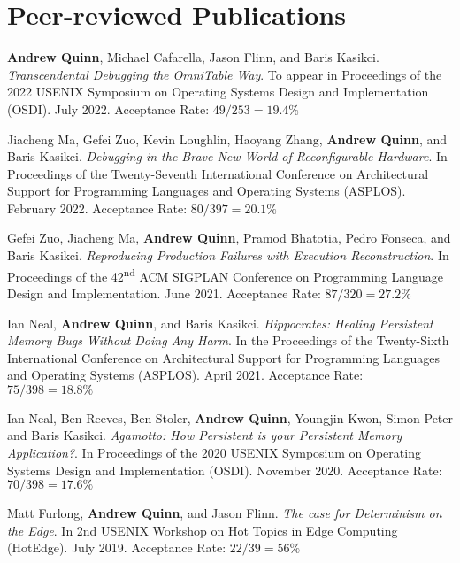 \documentclass[letterpaper,10pt]{article}
\newcommand{\paper}[3]{#1. #2 #3}
\begin{document}
\section{Peer-reviewed Publications}
\begin{smenumerate}
\item \paper{\textbf{Andrew Quinn}, Michael Cafarella, Jason Flinn,
  and Baris Kasikci}{\emph{Transcendental Debugging the OmniTable
  Way}.  To appear in Proceedings of the 2022 USENIX Symposium on
  Operating Systems Design and Implementation (OSDI).  July
  2022.}{Acceptance Rate: $49/253=19.4\%$}
      
\item \paper{Jiacheng Ma, Gefei Zuo, Kevin Loughlin, Haoyang Zhang,
  \textbf{Andrew Quinn}, and Baris Kasikci}{\emph{Debugging in the
  Brave New World of Reconfigurable Hardware}. In Proceedings of the
  Twenty-Seventh International Conference on Architectural Support for
  Programming Languages and Operating Systems (ASPLOS). February
  2022.}{Acceptance Rate: $80/397=20.1\%$}

  \item \paper{Gefei Zuo, Jiacheng Ma, \textbf{Andrew Quinn}, Pramod
    Bhatotia, Pedro Fonseca, and Baris Kasikci}{\emph{Reproducing
    Production Failures with Execution Reconstruction}. In Proceedings
    of the 42\textsuperscript{nd} ACM SIGPLAN Conference on
    Programming Language Design and Implementation. June
    2021.}{Acceptance Rate: $87/320=27.2\%$}

  \item \paper{Ian Neal, \textbf{Andrew Quinn}, and Baris
    Kasikci}{\emph{Hippocrates: Healing Persistent Memory Bugs Without
    Doing Any Harm}. In the Proceedings of the Twenty-Sixth
    International Conference on Architectural Support for Programming
    Languages and Operating Systems (ASPLOS). April 2021.}{Acceptance
    Rate: $75/398=18.8\%$}
    
  \item \paper{Ian Neal, Ben Reeves, Ben Stoler, \textbf{Andrew Quinn}, Youngjin Kwon,
    Simon Peter and Baris Kasikci}{\emph{Agamotto: How Persistent is your
    Persistent Memory Application?}.  In Proceedings of the 2020 USENIX
    Symposium on Operating Systems Design and Implementation (OSDI).  November
    2020.}{Acceptance Rate: $70/398=17.6\%$}

  \item \paper{Matt Furlong, \textbf{Andrew Quinn}, and Jason Flinn}
    {\emph{The case for Determinism on the Edge}.  In 2nd USENIX
      Workshop on Hot Topics in Edge Computing (HotEdge).  July
      2019.}{Acceptance Rate: $22/39=56\%$}


\end{smenumerate}
\end{document}
